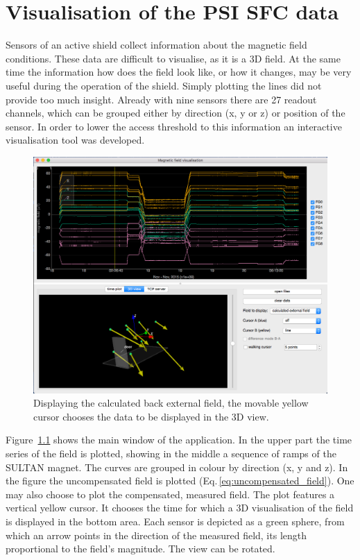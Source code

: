 
\chapter{Visualisation of the PSI SFC data}
Sensors of an active shield collect information about the magnetic field conditions. These data are difficult to visualise, as it is a 3D field. At the same time the information how does the field look like, or how it changes, may be very useful during the operation of the shield. Simply plotting the lines did not provide too much insight. Already with nine sensors there are 27 readout channels, which can be grouped either by direction (x, y or z) or position of the sensor. In order to lower the access threshold to this information an interactive visualisation tool was developed.

\begin{figure}
  \centering
  \includegraphics[width=0.8\linewidth]{gfx/nEDM_SFC/visualisation/visualisation1.png}
  \caption{Displaying the calculated back external field, the movable yellow cursor chooses the data to be displayed in the 3D view.}\label{fig:nEDM_SFC_visualisation1}
\end{figure}

Figure~\ref{fig:nEDM_SFC_visualisation1} shows the main window of the application. In the upper part the time series of the field is plotted, showing in the middle a sequence of ramps of the SULTAN magnet. The curves are grouped in colour by direction (x, y and z). In the figure the uncompensated field is plotted (Eq.\,\ref{eq:uncompensated_field}). One may also choose to plot the compensated, measured field. The plot features a vertical yellow cursor. It chooses the time for which a 3D visualisation of the field is displayed in the bottom area. Each sensor is depicted as a green sphere, from which an arrow points in the direction of the measured field, its length proportional to the field's magnitude. The view can be rotated.

